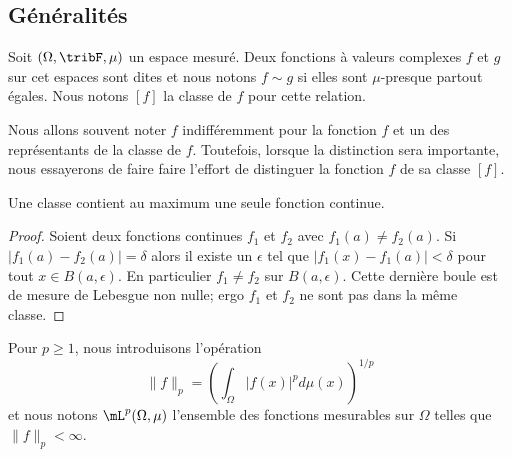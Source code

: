 \subsection{Généralités}

\begin{definition}      \label{DEFooKMJQooXeaUtp}
    Soit \( (\Omega,\tribF,\mu)\) un espace mesuré. Deux fonctions à valeurs complexes \( f\) et \( g\) sur cet espaces sont dites  et nous notons \( f\sim g\) si elles sont \( \mu\)-presque partout égales. Nous notons \( [f]\) la classe de \( f\) pour cette relation.
\end{definition}

Nous allons souvent noter \( f\) indifféremment pour la fonction \( f\) et un des représentants de la classe de \( f\). Toutefois, lorsque la distinction sera importante, nous essayerons de faire faire l'effort de distinguer la fonction \( f\) de sa classe \( [f]\).

\begin{lemma}
    Une classe contient au maximum une seule fonction continue.
\end{lemma}

\begin{proof}
    Soient deux fonctions continues \( f_1\) et \( f_2\) avec \( f_1(a)\neq f_2(a)\). Si \( | f_1(a)-f_2(a) |=\delta\) alors il existe un \( \epsilon\) tel que \( | f_1(x)-f_1(a) |<\delta\) pour tout \( x\in B(a,\epsilon)\). En particulier \( f_1\neq f_2\) sur \( B(a,\epsilon)\). Cette dernière boule est de mesure de Lebesgue non nulle; ergo \( f_1\) et \( f_2\) ne sont pas dans la même classe.
\end{proof}

\begin{definition}      \label{DEFooTHIDooWYzBtn}
    Pour \( p\geq 1\), nous introduisons l'opération
    \begin{equation}        \label{EQooBDBXooCHRmpo}
        \| f \|_p=\left( \int_{\Omega}| f(x) |^pd\mu(x) \right)^{1/p}
    \end{equation}
    et nous notons \( \mL^p(\Omega,\mu)\) l'ensemble des fonctions mesurables sur \( \Omega\) telles que \( \| f \|_p<\infty\).
\end{definition}

